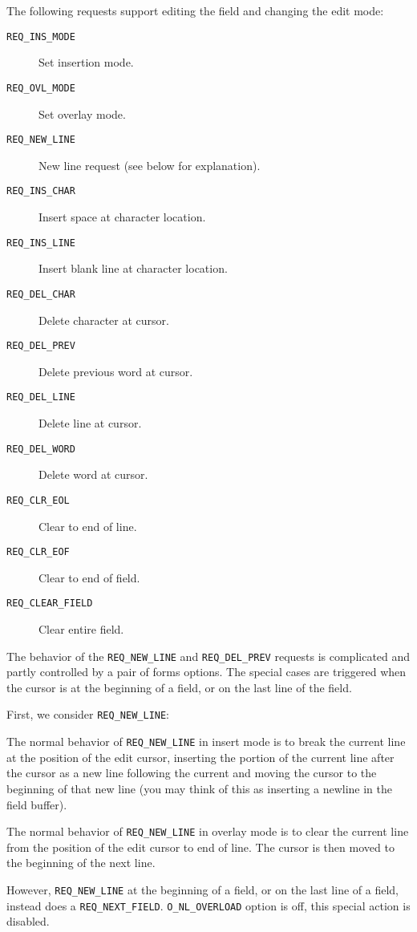 The following requests support editing the field and changing the edit
mode:
\begin{description}
\item[ \texttt{REQ\_INS\_MODE}]  Set insertion mode.
\item[ \texttt{REQ\_OVL\_MODE}]  Set overlay mode.
\item[ \texttt{REQ\_NEW\_LINE}]  New line request (see below for explanation).
\item[ \texttt{REQ\_INS\_CHAR}]  Insert space at character location.
\item[ \texttt{REQ\_INS\_LINE}]  Insert blank line at character location.
\item[ \texttt{REQ\_DEL\_CHAR}]  Delete character at cursor.
\item[ \texttt{REQ\_DEL\_PREV}]  Delete previous word at cursor.
\item[ \texttt{REQ\_DEL\_LINE}]  Delete line at cursor.
\item[ \texttt{REQ\_DEL\_WORD}]  Delete word at cursor.
\item[ \texttt{REQ\_CLR\_EOL}]  Clear to end of line.
\item[ \texttt{REQ\_CLR\_EOF}]  Clear to end of field.
\item[ \texttt{REQ\_CLEAR\_FIELD}]  Clear entire field.
\end{description}
The behavior of the \texttt{REQ\_NEW\_LINE} and \texttt{REQ\_DEL\_PREV} requests
is complicated and partly controlled by a pair of forms options.
The special cases are triggered when the cursor is at the beginning of
a field, or on the last line of the field. 

First, we consider \texttt{REQ\_NEW\_LINE}: 

The normal behavior of \texttt{REQ\_NEW\_LINE} in insert mode is to break the
current line at the position of the edit cursor, inserting the portion of
the current line after the cursor as a new line following the current
and moving the cursor to the beginning of that new line (you may think
of this as inserting a newline in the field buffer). 

The normal behavior of \texttt{REQ\_NEW\_LINE} in overlay mode is to clear the
current line from the position of the edit cursor to end of line.
The cursor is then moved to the beginning of the next line. 

However, \texttt{REQ\_NEW\_LINE} at the beginning of a field, or on the
last line of a field, instead does a \texttt{REQ\_NEXT\_FIELD}.
\texttt{O\_NL\_OVERLOAD} option is off, this special action is
disabled. 

